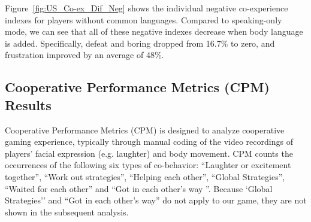 Figure~\ref{fig:US_Co-ex_Dif_Neg} shows the individual negative co-experience indexes for players without common languages. Compared to speaking-only mode, we can see that all of these negative indexes decrease when body language is added. Specifically, defeat and boring dropped from 16.7\% to zero, and frustration improved by an average of 48\%. 



\subsection{Cooperative Performance Metrics (CPM) Results}

Cooperative Performance Metrics (CPM)\cite{CPMs} is designed to analyze cooperative gaming experience, typically through manual coding of the video recordings of players' facial expression (e.g. laughter) and body movement. CPM counts the occurrences of the following six types of co-behavior: ``Laughter or excitement together'', ``Work out strategies'', ``Helping each other'', ``Global Strategies'', ``Waited for each other'' and ``Got in each other's way ''.
Because `Global Strategies'' and ``Got in each other's way'' do not apply to our game, they are not shown in the subsequent analysis.




